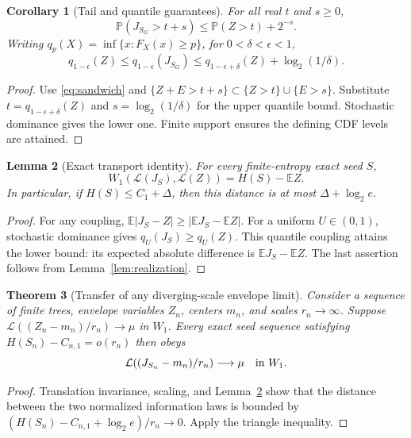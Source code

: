 \documentclass[11pt,a4paper]{article}
\newtheorem{theorem}{Theorem}
\newtheorem{lemma}[theorem]{Lemma}
\newtheorem{corollary}[theorem]{Corollary}
\newcommand{\E}{\mathbb E}
\newcommand{\Prob}{\mathbb P}
\begin{document}
\begin{corollary}[Tail and quantile guarantees]\label{cor:quantiles}
For all real $t$ and $s\ge0$,
\[
\Prob(J_{S_G}>t+s)\le\Prob(Z>t)+2^{-s}.
\]
Writing $q_p(X)=\inf\{x:F_X(x)\ge p\}$, for $0<\delta<\epsilon<1$,
\[
q_{1-\epsilon}(Z)\le q_{1-\epsilon}(J_{S_G})
\le q_{1-\epsilon+\delta}(Z)+\log_2(1/\delta).
\]
\end{corollary}
\begin{proof}
Use \eqref{eq:sandwich} and
$\{Z+E>t+s\}\subset\{Z>t\}\cup\{E>s\}$.
Substitute $t=q_{1-\epsilon+\delta}(Z)$ and
$s=\log_2(1/\delta)$ for the upper quantile bound. Stochastic dominance
gives the lower one. Finite support ensures the defining CDF levels
are attained.
\end{proof}

\begin{lemma}[Exact transport identity]\label{lem:transport}
For every finite-entropy exact seed $S$,
\begin{equation}\label{eq:transport}
W_1(\mathcal L(J_S),\mathcal L(Z))=H(S)-\E Z.
\end{equation}
In particular, if $H(S)\le C_1+\Delta$, then this distance is at most
$\Delta+\log_2e$.
\end{lemma}
\begin{proof}
For any coupling, $\E|J_S-Z|\ge|\E J_S-\E Z|$.
For a uniform $U\in(0,1)$, stochastic dominance gives
$q_U(J_S)\ge q_U(Z)$. This quantile coupling attains the lower bound:
its expected absolute difference is $\E J_S-\E Z$.
The last assertion follows from Lemma~\ref{lem:realization}.
\end{proof}

\begin{theorem}[Transfer of any diverging-scale envelope limit]\label{thm:transfer}
Consider a sequence of finite trees, envelope variables $Z_n$, centers
$m_n$, and scales $r_n\to\infty$. Suppose
$\mathcal L((Z_n-m_n)/r_n)\to\mu$ in $W_1$.
Every exact seed sequence satisfying $H(S_n)-C_{n,1}=o(r_n)$ then obeys
\[
\mathcal L((J_{S_n}-m_n)/r_n)\longrightarrow\mu\quad\hbox{in }W_1.
\]
\end{theorem}
\begin{proof}
Translation invariance, scaling, and Lemma~\ref{lem:transport} show that
the distance between the two normalized information laws is bounded by
$(H(S_n)-C_{n,1}+\log_2e)/r_n\to0$. Apply the triangle inequality.
\end{proof}
\end{document}
